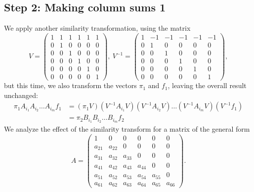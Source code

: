 \documentclass[a4paper,cleveref, autoref, thm-restate]{lipics-v2021}
\begin{document}
\subsection{Step 2: Making column sums 1}
\label{sec:step2}
 We apply another similarity transformation, using the matrix
\begin{displaymath}
V= \begin{pmatrix}%
1 & 1 & 1 & 1 & 1 & 1 \\
0 & 1 & 0 & 0 & 0 & 0 \\
0 & 0 & 1 & 0 & 0 & 0 \\
0 & 0 & 0 & 1 & 0 & 0 \\
0 & 0 & 0 & 0 & 1 & 0 \\
0 & 0 & 0 & 0 & 0 & 1
\end{pmatrix}, \
V^{-1}= \begin{pmatrix}%
1 & -1 & -1 & -1 & -1 & -1 \\
0 & 1 & 0 & 0 & 0 & 0 \\
0 & 0 & 1 & 0 & 0 & 0 \\
0 & 0 & 0 & 1 & 0 & 0 \\
0 & 0 & 0 & 0 & 1 & 0 \\
0 & 0 & 0 & 0 & 0 & 1
\end{pmatrix},
\end{displaymath}
but this time, we also transform the vectors $\pi_1$ and $f_1$,
leaving the overall result %
unchanged:
\begin{align}\nonumber
  \pi_1A_{i_1}A_{i_2} \ldots A_{i_m}f_1 &=
  (\pi_1V)
  (V^{-1}A_{i_1}V)
  (V^{-1}A_{i_2}V) \ldots
  (V^{-1}A_{i_m}V) 
  (V^{-1}f_1) \\&=
  \pi_2B_{i_1}B_{i_2} \ldots B_{i_m}f_2
  \label{eq:B}
\end{align}
We analyze the effect of the similarity transform for a matrix
of the general form
\begin{displaymath}
A= \begin{pmatrix}
1 & 0 & 0 & 0 & 0 & 0 \\
a_{21} & a_{22} & 0 & 0 & 0 & 0 \\
a_{31} & a_{32} & a_{33} & 0 & 0 & 0 \\
a_{41} & a_{42} & a_{43} & a_{44} & 0 & 0 \\
a_{51} & a_{52} & a_{53} & a_{54} & a_{55} & 0 \\
a_{61} & a_{62} & a_{63} & a_{64} & a_{65} & a_{66}
\end{pmatrix} .
\end{displaymath}
\end{document}
